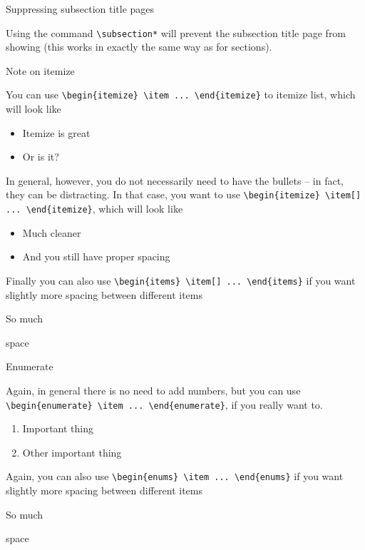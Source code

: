 \documentclass[unknownkeysallowed,aspectratio=43,10pt,onlymath]{beamer}
\begin{document}
\begin{frame}{Suppressing subsection title pages}

Using the command \texttt{\textbackslash subsection*} will prevent the subsection title page from showing (this works in exactly the same way as for sections).

\end{frame}

\begin{frame}{Note on itemize}

You can use \texttt{\textbackslash begin\{itemize\} \textbackslash item ... \textbackslash end\{itemize\}} to itemize list, which will look like
\begin{itemize}
\item Itemize is great
\item Or is it?
\end{itemize}

In general, however, you do not necessarily need to have the bullets -- in fact, they can be distracting. In that case, you want to use \texttt{\textbackslash begin\{itemize\} \textbackslash item[] ... \textbackslash end\{itemize\}}, which will look like
\begin{itemize}
\item[] Much cleaner
\item[] And you still have proper spacing
\end{itemize}

Finally you can also use \texttt{\textbackslash begin\{items\} \textbackslash item[] ... \textbackslash end\{items\}} if you want slightly more spacing between different items
\begin{items}
\item So much
\item space
\end{items}

\end{frame}

\begin{frame}{Enumerate}

Again, in general there is no need to add numbers, but you can use \texttt{\textbackslash begin\{enumerate\} \textbackslash item ... \textbackslash end\{enumerate\}}, if you really want to.
\begin{enumerate}
\item Important thing
\item Other important thing
\end{enumerate}

Again, you can also use \texttt{\textbackslash begin\{enums\} \textbackslash item ... \textbackslash end\{enums\}} if you want slightly more spacing between different items
\begin{enums}
\item So much
\item space
\end{enums}

\end{frame}
\end{document}

